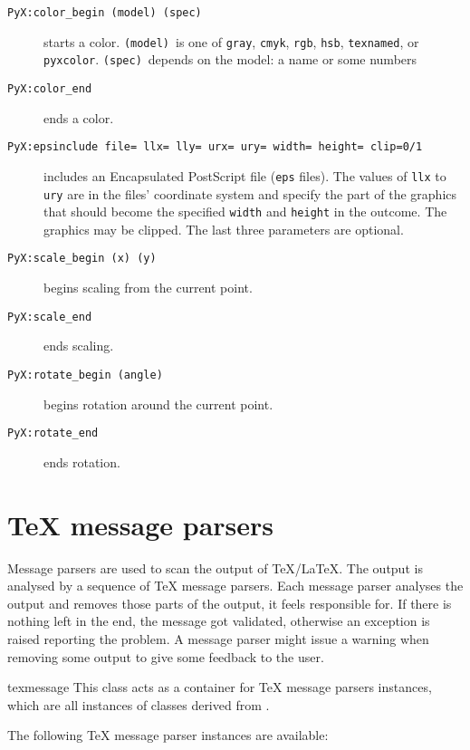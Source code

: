 \begin{description}
\item[\texttt{PyX:color\_begin (model) (spec)}]
  starts a color. \texttt{(model)}~is one of
  \texttt{gray}, \texttt{cmyk}, \texttt{rgb}, \texttt{hsb}, \texttt{texnamed}, or
  \texttt{pyxcolor}. \texttt{(spec)}~depends on the model: a name or
  some numbers
\item[\texttt{PyX:color\_end}]
  ends a color.
\item[\texttt{PyX:epsinclude file= llx= lly= urx= ury= width= height= clip=0/1}]
  includes an Encapsulated PostScript file (\texttt{eps}
  files). The values of \texttt{llx} to \texttt{ury} are in the files'
  coordinate system and specify the part of the graphics that should
  become the specified \texttt{width} and \texttt{height} in the
  outcome. The graphics may be clipped. The last three parameters are
  optional.
\item[\texttt{PyX:scale\_begin (x) (y)}]
  begins scaling from the current point.
\item[\texttt{PyX:scale\_end}]
  ends scaling.
\item[\texttt{PyX:rotate\_begin (angle)}]
  begins rotation around the current point.
\item[\texttt{PyX:rotate\_end}]
  ends rotation.
\end{description}

\section{\TeX{} message parsers}

Message parsers are used to scan the output of \TeX/\LaTeX. The output
is analysed by a sequence of \TeX{} message parsers. Each message
parser analyses the output and removes those parts of the output, it
feels responsible for. If there is nothing left in the end, the
message got validated, otherwise an exception is raised reporting the
problem. A message parser might issue a warning when removing some
output to give some feedback to the user.

\begin{classdesc}{texmessage}{}
  This class acts as a container for \TeX{} message parsers instances,
  which are all instances of classes derived from .
\end{classdesc}

The following \TeX{} message parser instances are available:

